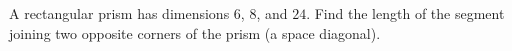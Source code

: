 A rectangular prism has dimensions \(6\), \(8\), and \(24\). Find the length of the segment joining two opposite corners of the prism (a space diagonal).

